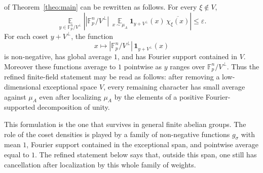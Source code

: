 \documentclass[11pt,reqno]{amsart}
\theoremstyle{plain}
\theoremstyle{remark}
\begin{document}
of Theorem~\ref{theo:main} can be rewritten as follows. For every
$\xi\notin V$,
$$
\mathop{\mathbb E}\limits_{y\in \mathbb F_p^n/V^\perp}
\left|
|\mathbb F_p^n/V^\perp|\,
\mathop{\mathbb E}\limits_{x\sim\mu_A}
\mathbf 1_{y+V^\perp}(x)\,\overline{\chi_\xi(x)}
\right|
\le \varepsilon.
$$
For each coset $y+V^\perp$, the function
$$
x\mapsto |\mathbb F_p^n/V^\perp|\,\mathbf 1_{y+V^\perp}(x)
$$
is non-negative, has global average $1$, and has Fourier support contained in
$V$. Moreover these functions average to $1$ pointwise as $y$ ranges over
$\mathbb F_p^n/V^\perp$. Thus the refined finite-field statement may be read
as follows: after removing a low-dimensional exceptional space $V$, every
remaining character has small average against $\mu_A$ even after localizing
$\mu_A$ by the elements of a positive Fourier-supported decomposition of
unity.

This formulation is the one that survives in general finite abelian groups. The role of the
coset densities is played by a family of non-negative functions
$g_\sigma$ with mean $1$, Fourier support contained in the exceptional span,
and pointwise average equal to $1$. The refined statement below says that,
outside this span, one still has cancellation after localization by this whole
family of weights.
\end{document}
